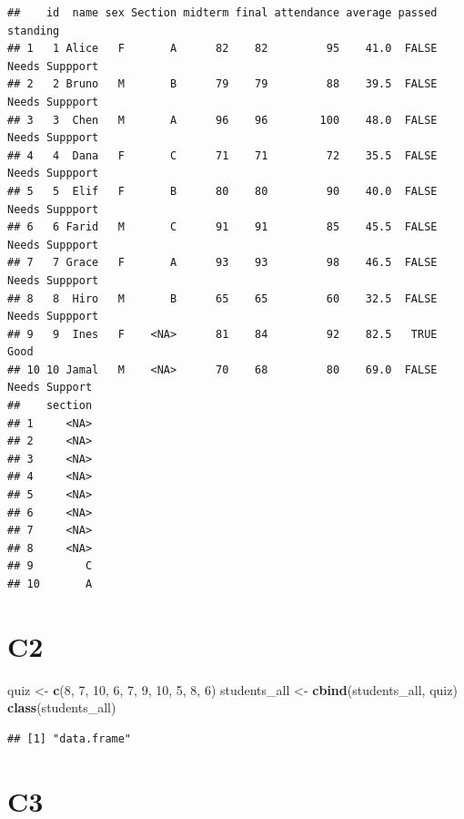 \documentclass[
]{article}
\newenvironment{Shaded}{\begin{snugshade}}{\end{snugshade}}
\newcommand{\AttributeTok}[1]{\textcolor[rgb]{0.13,0.29,0.53}{#1}}
\newcommand{\DecValTok}[1]{\textcolor[rgb]{0.00,0.00,0.81}{#1}}
\newcommand{\FunctionTok}[1]{\textcolor[rgb]{0.13,0.29,0.53}{\textbf{#1}}}
\newcommand{\NormalTok}[1]{#1}
\newcommand{\OtherTok}[1]{\textcolor[rgb]{0.56,0.35,0.01}{#1}}
\newcommand{\SpecialCharTok}[1]{\textcolor[rgb]{0.81,0.36,0.00}{\textbf{#1}}}
\begin{document}
\begin{verbatim}
##    id  name sex Section midterm final attendance average passed       standing
## 1   1 Alice   F       A      82    82         95    41.0  FALSE Needs Suppport
## 2   2 Bruno   M       B      79    79         88    39.5  FALSE Needs Suppport
## 3   3  Chen   M       A      96    96        100    48.0  FALSE Needs Suppport
## 4   4  Dana   F       C      71    71         72    35.5  FALSE Needs Suppport
## 5   5  Elif   F       B      80    80         90    40.0  FALSE Needs Suppport
## 6   6 Farid   M       C      91    91         85    45.5  FALSE Needs Suppport
## 7   7 Grace   F       A      93    93         98    46.5  FALSE Needs Suppport
## 8   8  Hiro   M       B      65    65         60    32.5  FALSE Needs Suppport
## 9   9  Ines   F    <NA>      81    84         92    82.5   TRUE           Good
## 10 10 Jamal   M    <NA>      70    68         80    69.0  FALSE  Needs Support
##    section
## 1     <NA>
## 2     <NA>
## 3     <NA>
## 4     <NA>
## 5     <NA>
## 6     <NA>
## 7     <NA>
## 8     <NA>
## 9        C
## 10       A
\end{verbatim}

\section{C2}\label{c2}

\begin{Shaded}
\begin{Highlighting}[]
\NormalTok{quiz }\OtherTok{\textless{}{-}} \FunctionTok{c}\NormalTok{(}\DecValTok{8}\NormalTok{, }\DecValTok{7}\NormalTok{, }\DecValTok{10}\NormalTok{, }\DecValTok{6}\NormalTok{, }\DecValTok{7}\NormalTok{, }\DecValTok{9}\NormalTok{, }\DecValTok{10}\NormalTok{, }\DecValTok{5}\NormalTok{, }\DecValTok{8}\NormalTok{, }\DecValTok{6}\NormalTok{)}
\NormalTok{students\_all }\OtherTok{\textless{}{-}} \FunctionTok{cbind}\NormalTok{(students\_all, quiz)}
\FunctionTok{class}\NormalTok{(students\_all)}
\end{Highlighting}
\end{Shaded}

\begin{verbatim}
## [1] "data.frame"
\end{verbatim}

\section{C3}\label{c3}

\begin{Shaded}
\end{Shaded}
\end{document}
